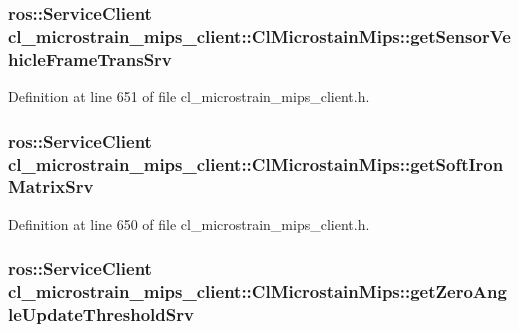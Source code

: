 \subsubsection[{\texorpdfstring{get\+Sensor\+Vehicle\+Frame\+Trans\+Srv}{getSensorVehicleFrameTransSrv}}]{\setlength{\rightskip}{0pt plus 5cm}ros\+::\+Service\+Client cl\+\_\+microstrain\+\_\+mips\+\_\+client\+::\+Cl\+Microstain\+Mips\+::get\+Sensor\+Vehicle\+Frame\+Trans\+Srv\hspace{0.3cm}{\ttfamily [protected]}}\hypertarget{classcl__microstrain__mips__client_1_1ClMicrostainMips_abfc167ed3141a0253dac8258f5092b6f}{}\label{classcl__microstrain__mips__client_1_1ClMicrostainMips_abfc167ed3141a0253dac8258f5092b6f}


Definition at line 651 of file cl\+\_\+microstrain\+\_\+mips\+\_\+client.\+h.

\subsubsection[{\texorpdfstring{get\+Soft\+Iron\+Matrix\+Srv}{getSoftIronMatrixSrv}}]{\setlength{\rightskip}{0pt plus 5cm}ros\+::\+Service\+Client cl\+\_\+microstrain\+\_\+mips\+\_\+client\+::\+Cl\+Microstain\+Mips\+::get\+Soft\+Iron\+Matrix\+Srv\hspace{0.3cm}{\ttfamily [protected]}}\hypertarget{classcl__microstrain__mips__client_1_1ClMicrostainMips_a8afab460c259396c582a0d583d593023}{}\label{classcl__microstrain__mips__client_1_1ClMicrostainMips_a8afab460c259396c582a0d583d593023}


Definition at line 650 of file cl\+\_\+microstrain\+\_\+mips\+\_\+client.\+h.

\subsubsection[{\texorpdfstring{get\+Zero\+Angle\+Update\+Threshold\+Srv}{getZeroAngleUpdateThresholdSrv}}]{\setlength{\rightskip}{0pt plus 5cm}ros\+::\+Service\+Client cl\+\_\+microstrain\+\_\+mips\+\_\+client\+::\+Cl\+Microstain\+Mips\+::get\+Zero\+Angle\+Update\+Threshold\+Srv\hspace{0.3cm}{\ttfamily [protected]}}\hypertarget{classcl__microstrain__mips__client_1_1ClMicrostainMips_aa6b984832ce7460569ce4f81982a6b8a}{}\label{classcl__microstrain__mips__client_1_1ClMicrostainMips_aa6b984832ce7460569ce4f81982a6b8a}



